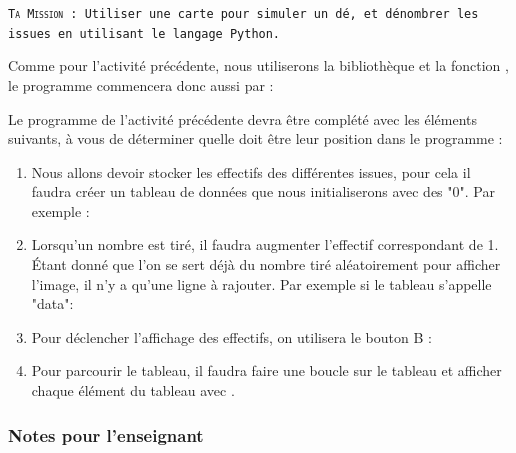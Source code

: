 \begin{eleve}    
    \texttt{\textsc{Ta Mission} : Utiliser une carte \mb  pour simuler un dé, et dénombrer les issues en utilisant le langage Python.}

Comme pour l'activité précédente, nous utiliserons la bibliothèque  et la fonction , le programme commencera donc aussi par :
     
Le programme de l'activité précédente devra être complété avec les éléments suivants, à vous de déterminer quelle doit être leur position dans le programme :

    \begin{enumerate}
    
    \item Nous allons devoir stocker les effectifs des différentes issues, pour cela il faudra créer un tableau de données que nous initialiserons avec des "0".
    Par exemple :
    
    
    
    \item Lorsqu'un nombre est tiré, il faudra augmenter l'effectif correspondant de 1. Étant donné que l'on se sert déjà du nombre tiré aléatoirement pour afficher l'image, il n'y a qu'une ligne à rajouter. Par exemple si le tableau s'appelle "data":
    
    \pyline{data[i] = [data[i]+1}
    
    
    \item Pour déclencher l'affichage des effectifs, on utilisera le bouton B :
    
    
    \item Pour parcourir le tableau, il faudra faire une boucle  sur le tableau et afficher chaque élément du tableau avec .
    
    \end{enumerate}
    
    
    

\end{eleve}

\newpage

\subsubsection{Notes pour l'enseignant}

